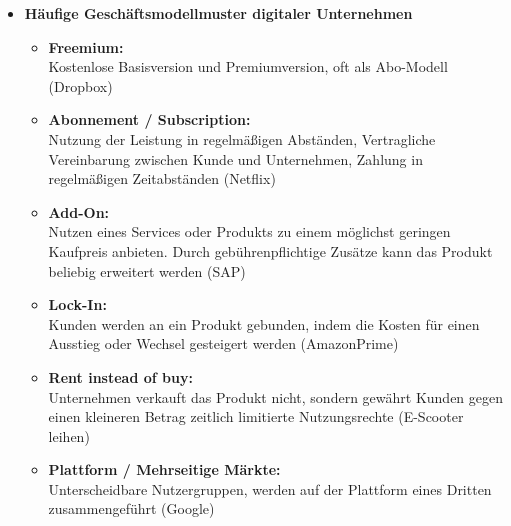 \documentclass[12pt,a4paper]{article}
\begin{document}
\begin{itemize}
   \item \textbf{Häufige Geschäftsmodellmuster digitaler Unternehmen}
			\begin{itemize}
				\item \textbf{Freemium:}\\
						Kostenlose Basisversion und Premiumversion, oft als Abo-Modell (Dropbox)
				\item \textbf{Abonnement / Subscription:}\\
				      Nutzung der Leistung in regelmäßigen Abständen, Vertragliche Vereinbarung zwischen Kunde und Unternehmen, Zahlung in regelmäßigen Zeitabständen (Netflix)
				\item \textbf{Add-On:}\\
						Nutzen eines Services oder Produkts zu einem möglichst geringen Kaufpreis anbieten. Durch gebührenpflichtige Zusätze kann das Produkt beliebig erweitert werden (SAP)
				\item \textbf{Lock-In:}\\
						Kunden werden an ein Produkt gebunden, indem die Kosten für einen Ausstieg oder Wechsel gesteigert werden (AmazonPrime)
				\item \textbf{Rent instead of buy:}\\
						Unternehmen verkauft das Produkt nicht, sondern gewährt Kunden gegen einen kleineren Betrag zeitlich limitierte Nutzungsrechte (E-Scooter leihen)
				\item \textbf{Plattform / Mehrseitige Märkte:}\\
						Unterscheidbare Nutzergruppen, werden auf der Plattform eines Dritten zusammengeführt (Google)
			\end{itemize}
\end{itemize}


\vspace{1cm}
\end{document}
